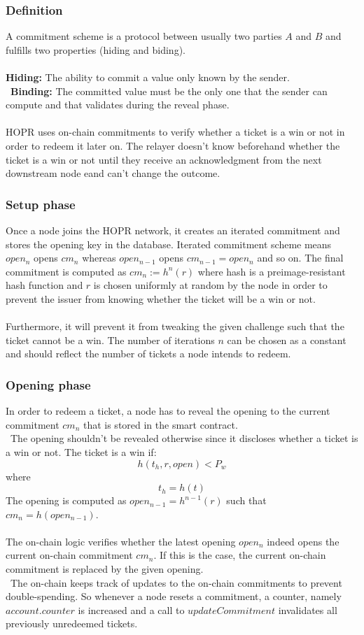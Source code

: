 \subsubsection*{Definition}
A commitment scheme is a protocol between usually two parties $A$ and $B$ and fulfills two properties (hiding and biding).
\\~\\\textbf{Hiding:} The ability to commit a value only known by the sender.
\\~\textbf{Binding:} The committed value must be the only one that the sender can compute and that validates during the reveal phase. 
\\~\\HOPR uses on-chain commitments to verify whether a ticket is a win or not in order to redeem it later on. The relayer doesn't know beforehand whether the ticket is a win or not until they receive an acknowledgment from the next downstream node eand can't change the outcome.
\subsubsection{Setup phase}
Once a node joins the HOPR network, it creates an iterated commitment and stores the opening key in the database. 
Iterated commitment scheme means $open_n$ opens $cm_n$ whereas $open_{n-1}$ opens $cm_{n-1}=open_n$ and so on. 
\newline The final commitment is computed as $cm_n:= h^n(r)$ where hash is a preimage-resistant hash function and 
$r$ is chosen uniformly at random by the node in order to prevent the issuer from knowing whether the ticket will be a win or not. 
\\~\\ Furthermore, it will prevent it from tweaking the given challenge such that the ticket cannot be a win.
The number of iterations $n$ can be chosen as a constant and should reflect the number of tickets a node intends to redeem.

\subsubsection{Opening phase}
In order to redeem a ticket, a node has to reveal the opening to the current commitment $cm_n$ that is stored in the smart contract. 
\\~The opening shouldn’t be revealed otherwise since it discloses whether a ticket is a win or not.
The ticket is a win if: $$h( t_h, r, open ) <P_w$$ where $$t_h=h(t)$$
The opening is computed as $open_{n-1} = h^{n-1}(r)$ such that $cm_n=h( open_{n-1})$. 
\\~\\The on-chain logic verifies whether the latest opening $open_n$ indeed opens the current on-chain commitment $cm_n$. 
If this is the case, the current on-chain commitment is replaced by the given opening. 
\\~The on-chain keeps track of updates to the on-chain commitments to prevent double-spending. 
So whenever a node resets a commitment, a counter, namely $account.counter$ is increased and a call to $updateCommitment$ invalidates all previously unredeemed tickets.



